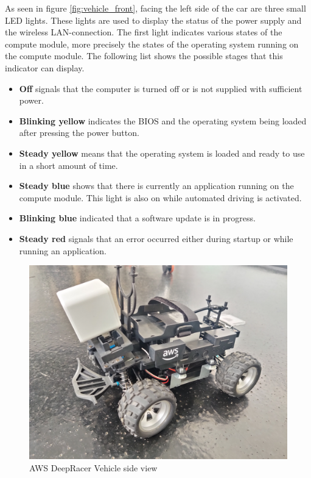 As seen in figure \ref{fig:vehicle_front}, facing the left side of the car are three small LED lights. These lights are used to display the status of the power supply and the wireless LAN-connection. The first light indicates various states of the compute module, more precisely the states of the operating system running on the compute module. The following list shows the possible stages that this indicator can display.
\begin{itemize}
    \item \textbf{Off} signals that the computer is turned off or is not supplied with sufficient power.
    \item \textbf{Blinking yellow} indicates the BIOS and the operating system being loaded after pressing the power button.
    \item \textbf{Steady yellow} means that the operating system is loaded and ready to use in a short amount of time.
    \item \textbf{Steady blue} shows that there is currently an application running on the compute module. This  light is also on while automated driving is activated.
    \item \textbf{Blinking blue} indicated that a software update is in progress.
    \item \textbf{Steady red} signals that an error occurred either during startup or while running an application.
\end{itemize}

\begin{figure}
    \centering
    \includegraphics[width=.85\textwidth]{images/IMG_20201117_091128.jpg}
    \caption{AWS DeepRacer Vehicle side view}
    \label{fig:vehicle_side}
\end{figure}

